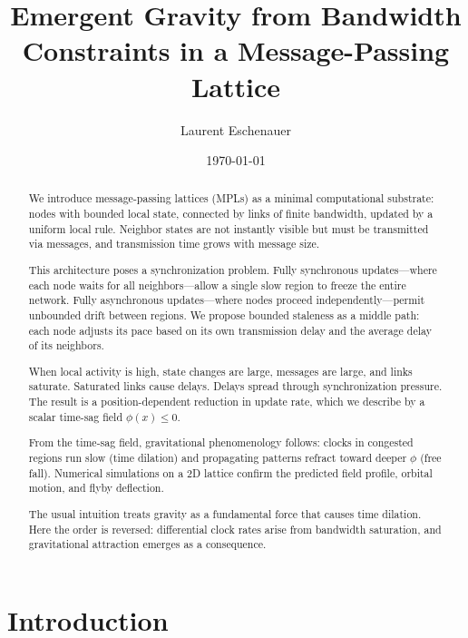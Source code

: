 \documentclass[aps, pra, reprint, superscriptaddress, nofootinbib, singlespacing]{revtex4-2}
\begin{document}
\title{Emergent Gravity from Bandwidth Constraints in a Message-Passing Lattice}

\author{Laurent Eschenauer}

\date{\today}

\begin{abstract}
We introduce message-passing lattices (MPLs) as a minimal computational substrate: nodes with bounded local state, connected by links of finite bandwidth, updated by a uniform local rule. Neighbor states are not instantly visible but must be transmitted via messages, and transmission time grows with message size.

This architecture poses a synchronization problem. Fully synchronous updates—where each node waits for all neighbors—allow a single slow region to freeze the entire network. Fully asynchronous updates—where nodes proceed independently—permit unbounded drift between regions. We propose bounded staleness as a middle path: each node adjusts its pace based on its own transmission delay and the average delay of its neighbors.

When local activity is high, state changes are large, messages are large, and links saturate. Saturated links cause delays. Delays spread through synchronization pressure. The result is a position-dependent reduction in update rate, which we describe by a scalar time-sag field $\phi(x) \leq 0$.

From the time-sag field, gravitational phenomenology follows: clocks in congested regions run slow (time dilation) and propagating patterns refract toward deeper $\phi$ (free fall). Numerical simulations on a 2D lattice confirm the predicted field profile, orbital motion, and flyby deflection.

The usual intuition treats gravity as a fundamental force that causes time dilation. Here the order is reversed: differential clock rates arise from bandwidth saturation, and gravitational attraction emerges as a consequence.
\end{abstract}


\maketitle

\section{Introduction}
\label{sec:intro}
\end{document}

